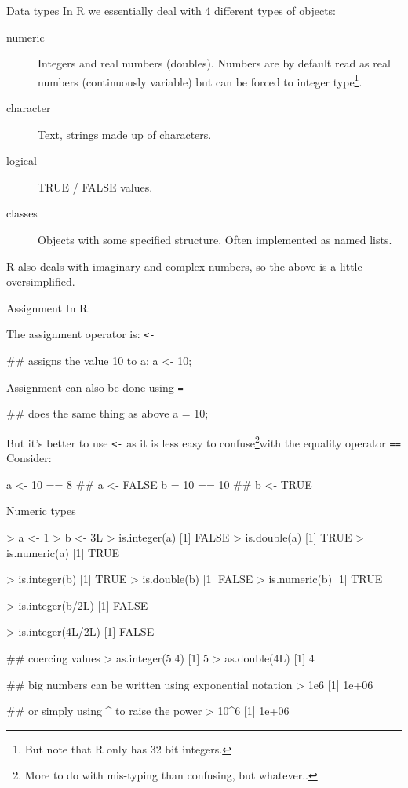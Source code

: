\documentclass[pdf]{beamer}
\begin{document}
\begin{frame}{Data types}
  In R we essentially deal with 4 different types of objects:
  \begin{description}
  \item[numeric] Integers and real numbers (doubles). Numbers are by default read as real
    numbers (continuously variable) but can be forced to integer
    type\footnote{But note that R only has 32 bit integers.}.
  \item[character] Text, strings made up of characters.
  \item[logical] TRUE / FALSE values.
  \item[classes] Objects with some specified structure. Often implemented as named lists.
  \end{description}
  
  R also deals with imaginary and complex numbers, so the above is a little oversimplified.
\end{frame}

\begin{frame}[fragile]{Assignment}
  In R:

  The assignment operator is: \verb|<-|
  \begin{rcode}
    ## assigns the value 10 to a:
    a <- 10;
  \end{rcode}

  Assignment can also be done using \verb|=|
  \begin{rcode}
    ## does the same thing as above
    a = 10;
  \end{rcode}

  But it's better to use \verb|<-| as it is less easy to confuse\footnote{More
    to do with mis-typing than confusing, but whatever..}with the
  equality operator \verb|==| Consider:
  \begin{rcode}
    a <- 10 == 8 ## a <- FALSE
    b = 10 == 10 ## b <- TRUE
  \end{rcode}

\end{frame}

\begin{frame}[fragile]{Numeric types}
  \begin{rcode}
    > a <- 1
    > b <- 3L
    > is.integer(a)
    [1] FALSE
    > is.double(a)
    [1] TRUE
    > is.numeric(a)
    [1] TRUE

    > is.integer(b)
    [1] TRUE
    > is.double(b)
    [1] FALSE
    > is.numeric(b)
    [1] TRUE

    > is.integer(b/2L)
    [1] FALSE

    > is.integer(4L/2L)
    [1] FALSE

    ## coercing values
    > as.integer(5.4)
    [1] 5
    > as.double(4L)
    [1] 4

    ## big numbers can be written using exponential notation
    > 1e6
    [1] 1e+06

    ## or simply using ^ to raise the power
    > 10^6
    [1] 1e+06
    
  \end{rcode}
\end{frame}
\end{document}
